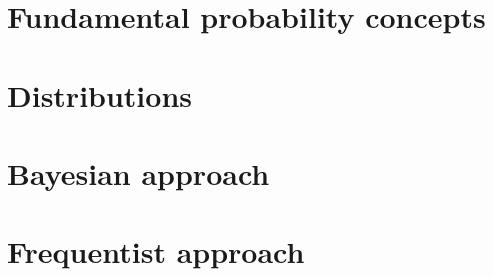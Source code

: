 \section{Fundamental probability concepts}


\section{Distributions}


% 

\section{Bayesian approach}


\section{Frequentist approach}

